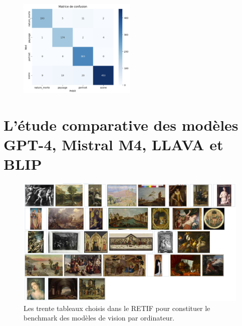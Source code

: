 \begin{figure}[H]
    \centering
    \includegraphics[width=0.5\textwidth]{annexes/stats/IAmatrice.png}
    \label{fig:matrice}
\end{figure}


\section[Étude comparative des modèles]{L'étude comparative des modèles GPT-4, Mistral M4, LLAVA et BLIP}

\begin{figure}[H]
    \centering
    \includegraphics[width=1\textwidth]{annexes/figures/benchmark.png}
    \caption{Les trente tableaux choisis dans le RETIF pour constituer le benchmark des modèles de vision par ordinateur.}
    \label{fig:benchmark}
\end{figure}

